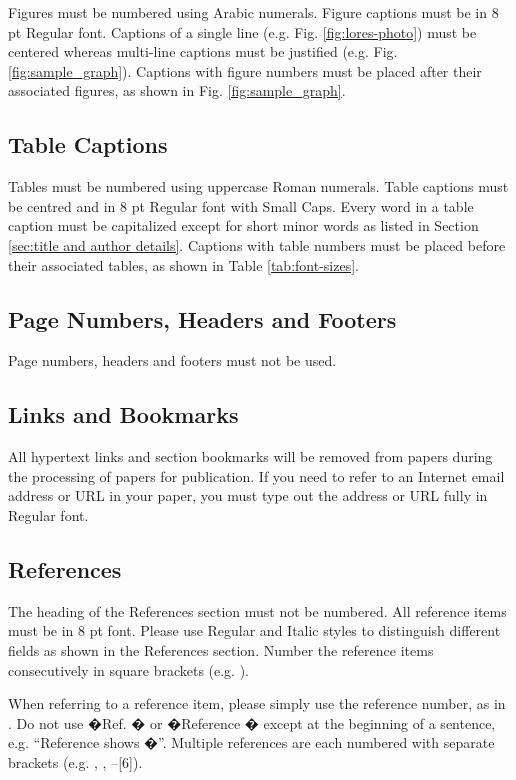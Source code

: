 \documentclass[10pt,conference,a4paper]{IEEEtran}
\begin{document}
Figures must be numbered using Arabic numerals.  Figure captions must
be in 8 pt Regular font.  Captions of a single line (e.g. Fig.
\ref{fig:lores-photo}) must be centered whereas multi-line captions
must be justified (e.g. Fig.  \ref{fig:sample_graph}).  Captions with
figure numbers must be placed after their associated figures, as shown
in Fig. \ref{fig:sample_graph}.

\subsection{Table Captions}

Tables must be numbered using uppercase Roman numerals.  Table
captions must be centred and in 8 pt Regular font with Small Caps.
Every word in a table caption must be capitalized except for short
minor words as listed in Section \ref{sec:title and author details}.
Captions with table numbers must be placed before their associated
tables, as shown in Table \ref{tab:font-sizes}.

\subsection{Page Numbers, Headers and Footers}

Page numbers, headers and footers must not be used.

\subsection{Links and Bookmarks}

All hypertext links and section bookmarks will be removed from
papers during the processing of papers for publication.  If you
need to refer to an Internet email address or URL in your paper,
you must type out the address or URL fully in Regular font.

\subsection{References}

The heading of the References section must not be numbered.
All reference items must be in 8 pt font.  Please
use Regular and Italic styles to distinguish different fields as
shown in the References section. Number the reference items
consecutively in square brackets (e.g. \cite{IEEEexample:book}).

When referring to a reference item, please simply use the
reference number, as in \cite{IEEEexample:bookwithseriesvolume}.
Do not use �Ref. \cite{IEEEexample:article_typical}� or
�Reference \cite{IEEEexample:article_typical}� except at the
beginning of a sentence, e.g.  ``Reference
\cite{IEEEexample:article_typical} shows �''.  Multiple
references are each numbered with separate brackets (e.g.
\cite{IEEEexample:bookwithseriesvolume},
\cite{IEEEexample:article_typical},
\cite{IEEEexample:confwithpaper}--[6]).
\end{document}
